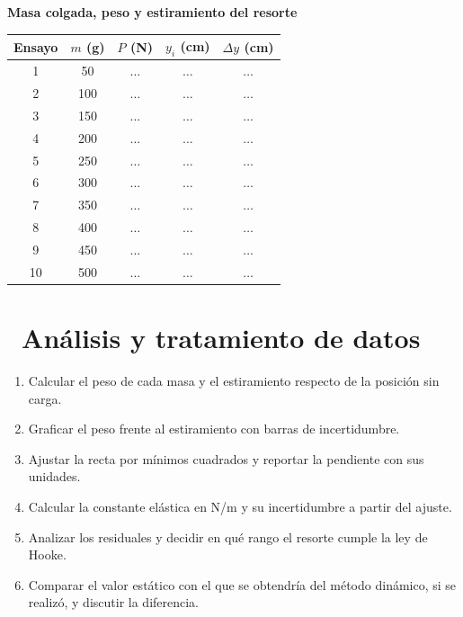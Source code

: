 \documentclass[11pt,a4paper]{article}
\newcommand{\iconotexto}[2]{\textcolor{cyanNeon}{\faIcon{#1}}~#2}
\begin{document}
\begin{center}
\begin{minipage}{\linewidth}
\centering
{\small
\textbf{Masa colgada, peso y estiramiento del resorte}\par\smallskip
\begin{tabular}{@{}ccccc@{}}
\toprule
Ensayo & $m$ (g) & $P$ (N) & $y_i$ (cm) & $\Delta y$ (cm) \\
\midrule
1 & 50 & $\ldots$ & $\ldots$ & $\ldots$ \\
2 & 100 & $\ldots$ & $\ldots$ & $\ldots$ \\
3 & 150 & $\ldots$ & $\ldots$ & $\ldots$ \\
4 & 200 & $\ldots$ & $\ldots$ & $\ldots$ \\
5 & 250 & $\ldots$ & $\ldots$ & $\ldots$ \\
6 & 300 & $\ldots$ & $\ldots$ & $\ldots$ \\
7 & 350 & $\ldots$ & $\ldots$ & $\ldots$ \\
8 & 400 & $\ldots$ & $\ldots$ & $\ldots$ \\
9 & 450 & $\ldots$ & $\ldots$ & $\ldots$ \\
10 & 500 & $\ldots$ & $\ldots$ & $\ldots$ \\
\bottomrule
\end{tabular}
}\par{}
\end{minipage}
\end{center}

\section{\iconotexto{calculator}{Análisis y tratamiento de datos}}

\begin{enumerate}[leftmargin=1.4em,itemsep=2pt,topsep=3pt]
  \item Calcular el peso de cada masa y el estiramiento respecto de la posición sin carga.
  \item Graficar el peso frente al estiramiento con barras de incertidumbre.
  \item Ajustar la recta por mínimos cuadrados y reportar la pendiente con sus unidades.
  \item Calcular la constante elástica en N/m y su incertidumbre a partir del ajuste.
  \item Analizar los residuales y decidir en qué rango el resorte cumple la ley de Hooke.
  \item Comparar el valor estático con el que se obtendría del método dinámico, si se realizó, y discutir la diferencia.
\end{enumerate}
\end{document}
